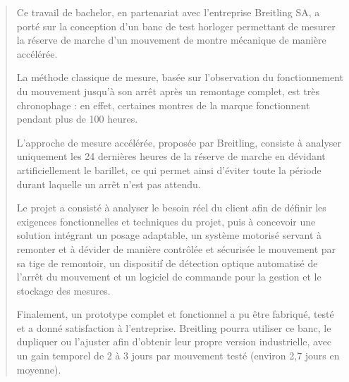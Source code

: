 \begin{abstract}

    Ce travail de bachelor, en partenariat avec l'entreprise Breitling SA, a porté sur la conception d'un banc de test horloger permettant de mesurer la réserve de marche d'un mouvement de montre mécanique de manière accélérée.

    La méthode classique de mesure, basée sur l'observation du fonctionnement du mouvement jusqu'à son arrêt après un remontage complet, est très chronophage : en effet, certaines montres de la marque fonctionnent pendant plus de 100 heures.

    L'approche de mesure accélérée, proposée par Breitling, consiste à analyser uniquement les 24 dernières heures de la réserve de marche en dévidant artificiellement le barillet, ce qui permet ainsi d'éviter toute la période durant laquelle un arrêt n'est pas attendu.

    Le projet a consisté à analyser le besoin réel du client afin de définir les exigences fonctionnelles et techniques du projet, puis à concevoir une solution intégrant un posage adaptable, un système motorisé servant à remonter et à dévider de manière contrôlée et sécurisée le mouvement par sa tige de remontoir, un dispositif de détection optique automatisé de l'arrêt du mouvement et un logiciel de commande pour la gestion et le stockage des mesures.

    Finalement, un prototype complet et fonctionnel a pu être fabriqué, testé et a donné satisfaction à l'entreprise. Breitling pourra utiliser ce banc, le dupliquer ou l'ajuster afin d'obtenir leur propre version industrielle, avec un gain temporel de 2 à 3 jours par mouvement testé (environ 2,7 jours en moyenne).

    \end{abstract}